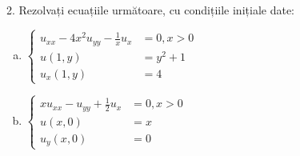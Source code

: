 \documentclass[11pt,a4paper]{article}
\theoremstyle{dotless}
\theoremstyle{dotlessdr}
\begin{document}
2. Rezolvați ecuațiile următoare, cu condițiile inițiale date:
\begin{enumerate}[(a)]
\item $ \begin{cases}
    u_{xx} - 4x^2 u_{yy} - \frac{1}{x} u_x &= 0, x > 0 \\
    u(1, y) &= y^2 + 1 \\
    u_x(1, y) &= 4
  \end{cases}
  $
\item $ \begin{cases}
    xu_{xx} - u_{yy} + \frac{1}{2} u_x &= 0, x > 0 \\
    u(x, 0) &= x \\
    u_y(x, 0) &= 0
  \end{cases}
$
\end{enumerate}
\end{document}
